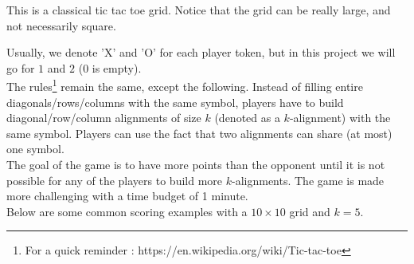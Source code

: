 \documentclass[12pt,a4paper,BCOR12mm, headexclude, footexclude, twoside, openright]{scrartcl}
\numberwithin{equation}{section} %
\numberwithin{figure}{section} %
\numberwithin{table}{section} %
\begin{document}
\begin{center}
\end{center}

This is a classical tic tac toe grid. Notice that the grid can be really large, and not necessarily square.

Usually, we denote 'X' and 'O' for each player token, but in this project we will go for $1$ and $2$ ($0$ is empty).\\

The rules\footnote{For a quick reminder : https://en.wikipedia.org/wiki/Tic-tac-toe} remain the same, except the following. Instead of filling entire diagonals/rows/columns with the same symbol, players have to build diagonal/row/column alignments of size $k$ (denoted as a $k$-alignment) with the same symbol. Players can use the fact that two alignments can share (at most) one symbol.\\

The goal of the game is to have more points than the opponent until it is not possible for any of the players to build more $k$-alignments. The game is made more challenging with a time budget of 1 minute.\\

Below are some common scoring examples with a $10 \times 10$ grid and $k = 5$.
\end{document}
